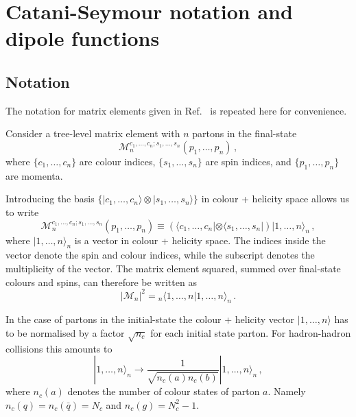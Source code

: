 \documentclass[main.tex]{subfiles}
\begin{document}
\chapter{Catani-Seymour notation and dipole functions}
\label{appendix:catani_seymour}
    \section{Notation}
    The notation for matrix elements given in Ref.~\cite{Catani:1996vz}
    is repeated here for convenience.

    Consider a tree-level matrix element with $n$ partons in
    the final-state
    \begin{equation}\label{eqn:CS_ME}
        \mathcal{M}^{c_{1},\ldots,c_{n};s_{1},\ldots,s_{n}}_{n}(p_{1},\ldots,p_{n}) \, ,
    \end{equation}
    where $\{c_{1},\ldots,c_{n}\}$ are colour indices,
    $\{s_{1},\ldots,s_{n}\}$ are spin indices,
    and $\{p_{1},\ldots,p_{n}\}$ are momenta.

    Introducing the basis $\{| c_{1},\ldots,c_{n} \rangle \otimes | s_{1},\ldots,s_{n} \rangle \}$
    in colour + helicity space allows us to write
    \begin{equation}\label{eqn:CS_hilbert}
        \mathcal{M}^{c_{1},\ldots,c_{n};s_{1},\ldots,s_{n}}_{n}(p_{1},\ldots,p_{n}) \equiv \left(\langle c_{1},\ldots,c_{n} | \otimes \langle s_{1},\ldots,s_{n} | \right) | 1, \ldots,n \rangle_{n} \, ,
    \end{equation}
    where $|1, \ldots, n \rangle_{n}$ is a vector in colour + helicity space.
    The indices inside the vector denote the spin and colour indices,
    while the subscript denotes the multiplicity of the vector.
    The matrix element squared, summed over final-state colours and spins,
    can therefore be written as
    \begin{equation}\label{eqn:CS_ME2}
        |\mathcal{M}_{n}|^{2} = {}_{n} \langle 1,\ldots,n|1,\ldots,n\rangle_{n} \, .
    \end{equation}

    In the case of partons in the initial-state the colour + helicity vector
    $|1, \ldots, n \rangle$ has to be normalised by a factor $\sqrt{n_{c}}$ for each
    initial state parton. For hadron-hadron collisions this amounts to
    \begin{equation}
        | 1, \ldots, n \rangle_{n} \rightarrow \dfrac{1}{\sqrt{n_{c}(a)n_{c}(b)}} | 1, \ldots, n \rangle_{n} \, ,
    \end{equation}
    where $n_{c}(a)$ denotes the number of colour states of parton $a$.
    Namely $n_{c}(q) = n_{c}(\bar{q}) = N_{c}$ and $n_{c}(g) = N_{c}^{2}-1$.
\end{document}
